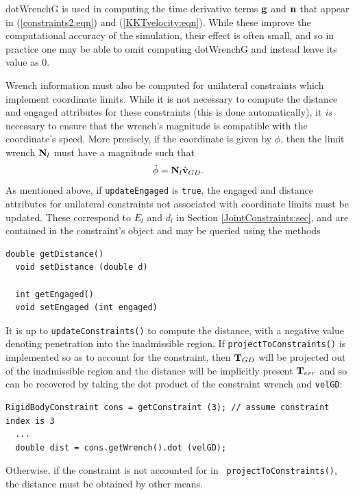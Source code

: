 \begin{sideblock}
{\sf dotWrenchG} is used in computing the time derivative terms ${\bf g}$
and ${\bf n}$ that appear in (\ref{constraints2:eqn}) and
(\ref{KKTvelocity:eqn}). While these improve the computational
accuracy of the simulation, their effect is often small, and so in
practice one may be able to omit computing {\sf dotWrenchG} and
instead leave its value as 0.
\end{sideblock}

Wrench information must also be computed for unilateral constraints
which implement coordinate limits. While it is not necessary to
compute the {\sf distance} and {\sf engaged} attributes for these
constraints (this is done automatically), it {\it is} necessary to
ensure that the wrench's magnitude is compatible with the coordinate's
speed. More precisely, if the coordinate is given by $\phi$, then the
limit wrench ${\bf N}_l$ must have a magnitude such that
%
\begin{equation}
\dot\phi = {\bf N}_l \hat{{\bf v}}_{GD}.
\end{equation}
%
As mentioned above, if {\tt updateEngaged} is {\tt true}, the {\sf
engaged} and {\sf distance} attributes for unilateral constraints not
associated with coordinate limits must be updated.  These correspond
to $E_l$ and $d_l$ in Section \ref{JointConstraints:sec}, and are
contained in the constraint's
 object and may
be queried using the methods
%
\begin{lstlisting}[]
  double getDistance()
  void setDistance (double d)

  int getEngaged()
  void setEngaged (int engaged)
\end{lstlisting}
%
It is up to {\tt updateConstraints()} to compute the distance, with
a negative value denoting penetration into the inadmissible
region. If {\tt projectToConstraints()} is
implemented so as to account for the constraint, then ${\bf T}_{GD}$ will
be projected out of the inadmissible region and the distance will be
implicitly present ${\bf T}_{err}$ and so can be recovered by taking
the dot product of the constraint wrench and {\tt velGD}:
%
\begin{lstlisting}[]
  RigidBodyConstraint cons = getConstraint (3); // assume constraint index is 3
  ...
  double dist = cons.getWrench().dot (velGD);
\end{lstlisting}
%
Otherwise, if the constraint is not accounted for in {\tt
projectToConstraints()}, the distance must be obtained by other means.

